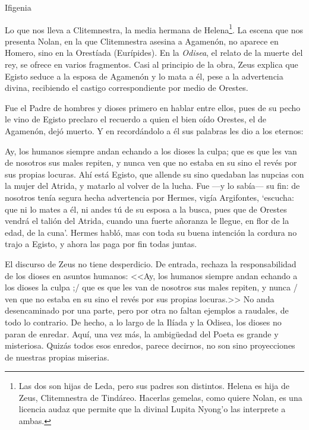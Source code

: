 Ifigenia



Lo que nos lleva a Clitemnestra, la media hermana de Helena\footnote{Las dos son hijas de Leda, pero sus padres son distintos. Helena es hija de Zeus, Clitemnestra de Tindáreo. Hacerlas gemelas, como quiere Nolan, es una licencia audaz que permite que la divinal Lupita Nyong'o las interprete a ambas.}. La escena que nos presenta Nolan, en la que Clitemnestra asesina a Agamenón, no aparece en Homero, sino en la Orestíada (Eurípides). En la \emph{Odisea}, el relato de la muerte del rey, se ofrece en varios fragmentos. Casi al principio de la obra, Zeus explica que Egisto seduce a la esposa de Agamenón y lo mata a él, pese a la advertencia divina, recibiendo el castigo correspondiente por medio de Orestes. 


Fue el Padre de hombres y dioses primero en hablar entre ellos,
pues de su pecho le vino de Egisto preclaro el recuerdo
a quien el bien oído Orestes, el de Agamenón, dejó muerto.		
Y en recordándolo a él sus palabras les dio a los eternos:

Ay, los humanos siempre andan echando a los dioses la culpa;
que es que les van de nosotros sus males repiten, y nunca
ven que no estaba en su sino el revés por sus propias locuras.
Ahí está Egisto, que allende su sino quedaban las nupcias			
con  la mujer del Atrida, y matarlo al volver de la lucha. 
Fue —y lo sabía— su fin: de nosotros tenía segura
hecha advertencia por Hermes, vigía Argifontes, ‘escucha:  
que ni lo mates a él, ni andes tú de su esposa a la busca,
pues que de Orestes vendrá el talión del Atrida, cuando una		
fuerte añoranza le llegue, en flor de la edad, de la cuna’.
Hermes habló, mas con toda su buena intención la cordura
no trajo a Egisto, y ahora las paga por fin todas juntas.

El discurso de Zeus no tiene desperdicio. De entrada, rechaza la responsabilidad de los dioses en asuntos humanos: <<Ay, los humanos siempre andan echando a los dioses la culpa ;/ que es que les van de nosotros sus males repiten, y nunca /
ven que no estaba en su sino el revés por sus propias locuras.>> No anda desencaminado por una parte, pero por otra no faltan ejemplos a raudales, de todo lo contrario. De hecho, a lo largo de la Ilíada y la Odisea, los dioses no paran de enredar. Aquí, una vez más, la ambigüedad del Poeta es grande y misteriosa. Quizás todos esos enredos, parece decirnos, no son sino proyecciones de nuestras propias miserias. 

